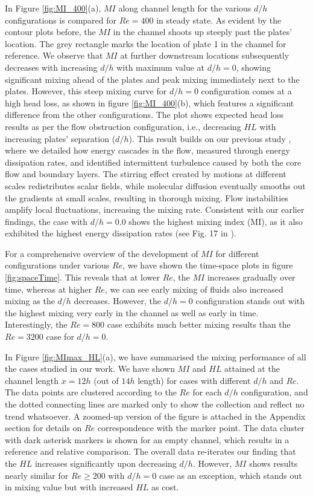 \documentclass[reprint,a4paper,fleqn]{cas-dc} %
\begin{document}
		In Figure \ref{fig:MI_400}(a), $MI$ along channel length for the various $d/h$ configurations is compared for $Re=400$ in steady state. As evident by the contour plots before, the $MI$ in the channel shoots up steeply past the plates' location. The grey rectangle marks the location of plate 1 in the channel for reference. We observe that $MI$ at further downstream locations subsequently decreases with increasing $d/h$ with maximum value at $d/h=0$, showing significant mixing ahead of the plates and peak mixing immediately next to the plates. However, this steep mixing curve for $d/h=0$ configuration comes at a high head loss, as shown in figure \ref{fig:MI_400}(b), which features a significant difference from the other configurations. The plot shows expected head loss results as per the flow obstruction configuration, i.e., decreasing $HL$ with increasing plates' separation ($d/h$). This result builds on our previous study \cite{Self2019}, where we detailed how energy cascades in the flow, measured through energy dissipation rates, and identified intermittent turbulence caused by both the core flow and boundary layers. The stirring effect created by motions at different scales redistributes scalar fields, while molecular diffusion eventually smooths out the gradients at small scales, resulting in thorough mixing. Flow instabilities amplify local fluctuations, increasing the mixing rate. Consistent with our earlier findings, the case with $d/h=0.0$ shows the highest mixing index (MI), as it also exhibited the highest energy dissipation rates (see Fig. 17 in \cite{Self2019}).
		
		For a comprehensive overview of the development of $MI$ for different configurations under various $Re$, we have shown the time-space plots in figure \ref{fig:spaceTime}. This reveals that at lower $Re$, the $MI$ increases gradually over time, whereas at higher $Re$, we can see early mixing of fluids also increased mixing as the $d/h$ decreases. However, the $d/h=0$ configuration stands out with the highest mixing very early in the channel as well as early in time. Interestingly, the $Re=800$ case exhibits much better mixing results than the $Re=3200$ case for $d/h=0$.
		
		In Figure \ref{fig:MImax_HL}(a), we have summarised the mixing performance of all the cases studied in our work. We have shown $MI$ and $HL$ attained at the channel length $x=12h$ (out of $14h$ length) for cases with different $d/h$ and $Re$. The data points are clustered according to the $Re$ for each $d/h$ configuration, and the dotted connecting lines are marked only to show the collection and reflect no trend whatsoever. A zoomed-up version of the figure is attached in the Appendix section for details on $Re$ correspondence with the marker point. The data cluster with dark asterisk markers is shown for an empty channel, which results in a reference and relative comparison. The overall data re-iterates our finding that the $HL$ increases significantly upon decreasing $d/h$. However, $MI$ shows results nearly similar for $Re\geq200$ with $d/h=0$ case as an exception, which stands out in mixing value but with increased $HL$ as cost.
		
\end{document}
